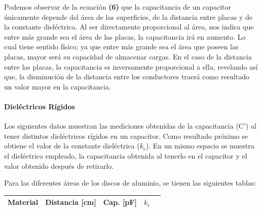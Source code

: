 \documentclass[letterpaper, 11 pt]{article}
\begin{document}
\begin{multicols}{2}
Podemos observar de la ecuación \textbf{(6)} que la capacitancia de un capacitor únicamente depende del área de las superficies, de la distancia entre placas y de la constante dieléctrica. 
Al ser directamente proporcional al área, nos indica que entre más grande sea el área de las placas, la capacitancia irá en aumento. Lo cual tiene sentido físico; ya que entre más grande sea el área que poseen las placas, mayor será su capacidad de almacenar cargas. En el caso de la distancia entre las placas, la capacitancia es inversamente proporcional a ella, revelando así que, la disminución de la distancia entre los conductores traerá como resultado un valor mayor en la capacitancia. 


\paragraph{Dieléctricos Rígidos}

Los siguientes datos muestran las mediciones obtenidas de la capacitancia (C') al tener distintos dieléctricos rígidos en un capacitor. Como resultado próximo se obtiene el valor de la constante dieléctrica ($k_\epsilon$).
En un mismo espacio se muestra el dieléctrico empleado, la capacitancia obtenida al tenerlo en el capacitor y el valor obtenido después de retirarlo.

Para las diferentes áreas de los discos de aluminio, se tienen las siguientes tablas:




\begin{table}[H]
\begin{center}
\begin{tabular}{ |c|c|c|c|c| } 
\hline
Material   & Distancia [cm]   & Cap. [pF] & $k_\epsilon$ \\
\hline


\end{tabular}
\end{center}
\end{table}
\end{multicols}
\end{document}
